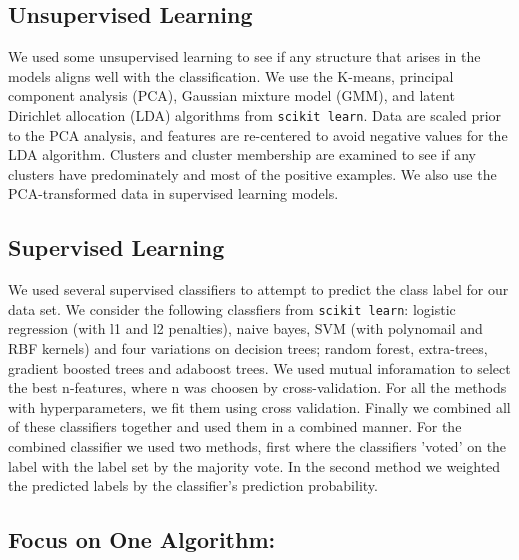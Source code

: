 \subsection{Unsupervised Learning}
We used some unsupervised learning to see if any structure that arises in the models aligns well with the classification.  We use the K-means, principal component analysis (PCA), Gaussian mixture model (GMM), and latent Dirichlet allocation (LDA) algorithms from \texttt{scikit learn}\cite{scikit-learn}.  Data are scaled prior to the PCA analysis, and features are re-centered to avoid negative values for the LDA algorithm.  Clusters and cluster membership are examined to see if any clusters have predominately and most of the positive examples. We also use the PCA-transformed data in supervised learning models.




\subsection{Supervised Learning}
We used several supervised classifiers to attempt to predict the class label for our data set. We consider the following classfiers from \texttt{scikit learn}\cite{scikit-learn}: logistic regression (with l1 and l2 penalties), naive bayes, SVM (with polynomail and RBF kernels) and four variations on decision trees; random forest, extra-trees, gradient boosted trees and adaboost trees. We used mutual inforamation to select the best n-features, where n was choosen by cross-validation. For all the methods with hyperparameters, we fit them using cross validation. Finally we combined all of these classifiers together and used them in a combined manner. For the combined classifier we used two methods, first where the classifiers 'voted' on the label with the label set by the majority vote. In the second method we weighted the predicted labels by the classifier's prediction probability.





\subsection{Focus on One Algorithm: }